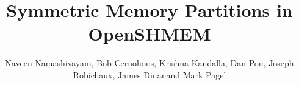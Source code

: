 \documentclass[runningheads,a4paper]{llncs}
\begin{document}
\mainmatter
\title{Symmetric Memory Partitions in OpenSHMEM}
\author{Naveen Namashivayam\affmark[1],
        Bob Cernohous\affmark[1],
        Krishna Kandalla\affmark[1],
        Dan Pou\affmark[1],
        Joseph Robichaux\affmark[2],
        James Dinan\affmark[2]
        and Mark Pagel\affmark[1]}


\maketitle
\begin{abstract}

\end{abstract}














\end{document}
